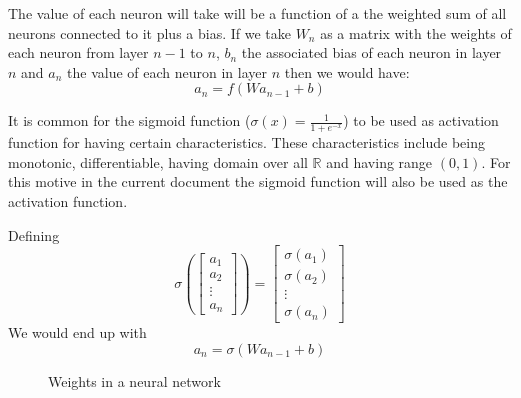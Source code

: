 \documentclass[a4paper, 12pts]{amsart}
\begin{document}
The value of each neuron will take will be a function of a the weighted sum
of all neurons connected to it plus a bias. If we take $W_n$ as a matrix with
the weights of each neuron from layer $n-1$ to $n$, $b_n$ the associated bias
of each neuron in layer $n$ and $a_n$ the value of each neuron in layer $n$
then we would have:
\[a_n=f(Wa_{n-1}+b)\]

It is common for the sigmoid function ($\sigma(x)=\frac{1}{1+e^{-x}}$)
to be used as activation function for having certain characteristics.
These characteristics include being monotonic, differentiable, having domain
over all $\mathbb{R}$ and having range $(0,1)$. For this motive in the current
document the sigmoid function will also be used as the activation function.

Defining
\[\sigma\left(
  \begin{bmatrix}
    a_1\\
    a_2\\
    \vdots\\
    a_n
  \end{bmatrix}
  \right) =
  \begin{bmatrix}
    \sigma(a_1)\\
    \sigma(a_2)\\
    \vdots\\
    \sigma(a_n)
  \end{bmatrix}
\]
We would end up with
\[a_n=\sigma(Wa_{n-1}+b)\]


\begin{figure}[!h]
  \centering
  \def\layersep{2.5cm}

  \caption{Weights in a neural network}
\end{figure}
\end{document}
